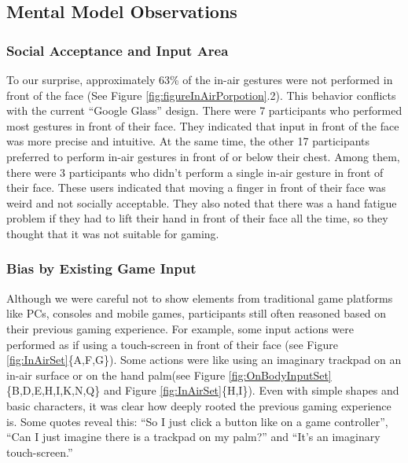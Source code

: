 \documentclass{sigchi}
\begin{document}
  \subsection{Mental Model Observations}
    \subsubsection{Social Acceptance and Input Area}
    To our surprise, approximately 63\% of the in-air gestures were not performed in front of the face (See Figure \ref{fig:figureInAirPorpotion}.2). This behavior conflicts with the current ``Google Glass'' design. There were 7 participants who performed most gestures in front of their face. They indicated that input in front of the face was more precise and intuitive. At the same time, the other 17 participants preferred to perform in-air gestures in front of or below their chest. Among them, there were 3 participants who didn't perform a single in-air gesture in front of their face. These users indicated that moving a finger in front of their face was weird and not socially acceptable. They also noted that there was a hand fatigue problem if they had to lift their hand in front of their face all the time, so they thought that it was not suitable for gaming.

    \subsubsection{Bias by Existing Game Input}
    Although we were careful not to show elements from traditional game platforms like PCs, consoles and mobile games, participants still often reasoned based on their previous gaming experience. For example, some input actions were performed as if using a touch-screen in front of their face (see Figure \ref{fig:InAirSet}\{A,F,G\}). Some actions were like using an imaginary trackpad on an in-air surface or on the hand palm(see Figure \ref{fig:OnBodyInputSet}\{B,D,E,H,I,K,N,Q\} and Figure \ref{fig:InAirSet}\{H,I\}). Even with simple shapes and basic characters, it was clear how deeply rooted the previous gaming experience is. Some quotes reveal this: ``So I just click a button like on a game controller'', ``Can I just imagine there is a trackpad on my palm?'' and ``It's an imaginary touch-screen.''
\end{document}
